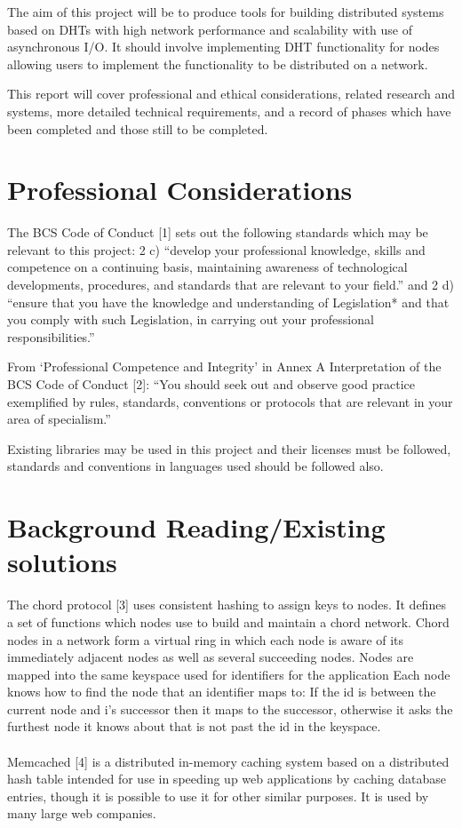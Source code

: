 \documentclass{article}
\begin{document}
The aim of this project will be to produce tools for building distributed systems based on DHTs with high network performance and scalability with use of asynchronous I/O. It should involve implementing DHT functionality for nodes allowing users to implement the functionality to be distributed on a network.

This report will cover professional and ethical considerations, related research and systems, more detailed technical requirements, and a record of phases which have been completed and those still to be completed.

\section{Professional Considerations}
The BCS Code of Conduct [1] sets out the following standards which may be relevant to this project: 2 c) “develop your professional knowledge, skills and competence on a continuing basis, maintaining awareness of technological developments, procedures, and standards that are relevant to your field.” and 2 d) “ensure that you have the knowledge and understanding of Legislation* and that you comply with such Legislation, in carrying out your professional responsibilities.”

From ‘Professional Competence and Integrity’ in Annex A Interpretation of the BCS Code of Conduct [2]: “You should seek out and observe good practice exemplified by rules, standards, conventions or protocols that are relevant in your area of specialism.”

Existing libraries may be used in this project and their licenses must be followed, standards and conventions in languages used should be followed also.



\section{Background Reading/Existing solutions}
The chord protocol [3] uses consistent hashing to assign keys to nodes. It defines a set of functions which nodes use to build and maintain a chord network. Chord nodes in a network form a virtual ring in which each node is aware of its immediately adjacent nodes as well as several succeeding nodes.
Nodes are mapped into the same keyspace used for identifiers for the application
Each node knows how to find the node that an identifier maps to: If the id is between the current node and i's successor then it maps to the successor, otherwise it asks the furthest node it knows about that is not past the id in the keyspace.
\\
\\
Memcached [4] is a distributed in-memory caching system based on a distributed hash table intended for use in speeding up web applications by caching database entries, though it is possible to use it for other similar purposes. It is used by many large web companies.
\end{document}
